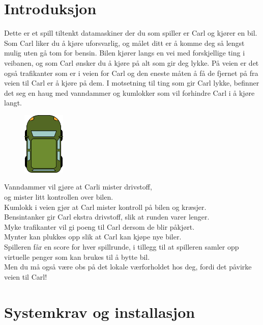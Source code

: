 \documentclass[paper=a4]{article}
\begin{document}
\section{Introduksjon}
Dette er et spill tiltenkt datamaskiner der du som spiller er Carl og kjører en bil. 
Som Carl liker du å kjøre uforsvarlig, og målet ditt er å komme deg så lengst mulig uten gå tom for bensin. 
Bilen kjører langs en vei med forskjellige ting i veibanen, og som Carl ønsker du å kjøre på alt som gir deg lykke. 
På veien er det også trafikanter som er i veien for Carl og den eneste måten å få de fjernet på fra veien til Carl er å kjøre på dem.
I motsetning til ting som gir Carl lykke, befinner det seg en haug med vanndammer og kumlokker som vil forhindre Carl i å kjøre langt. 
\begin{figure}
\includegraphics[width=2cm]{images/car.png}
\end{figure} 
Vanndammer vil gjøre at Carli mister drivstoff, \\ og mister litt kontrollen over bilen. \\
Kumlokk i veien gjør at Carl mister kontroll på bilen og kræsjer. \\
Bensintanker gir Carl ekstra drivstoff, slik at runden varer lenger. \\
Myke trafikanter vil gi poeng til Carl dersom de blir påkjørt. \\
Mynter kan plukkes opp slik at Carl kan kjøpe nye biler. \\
Spilleren får en score for hver spillrunde, i tillegg til at spilleren samler opp virtuelle penger som kan brukes til å bytte bil. \\
Men du må også være obs på det lokale værforholdet hos deg, fordi det påvirke veien til Carl! 

\newpage

\section{Systemkrav og installasjon}
\end{document}
